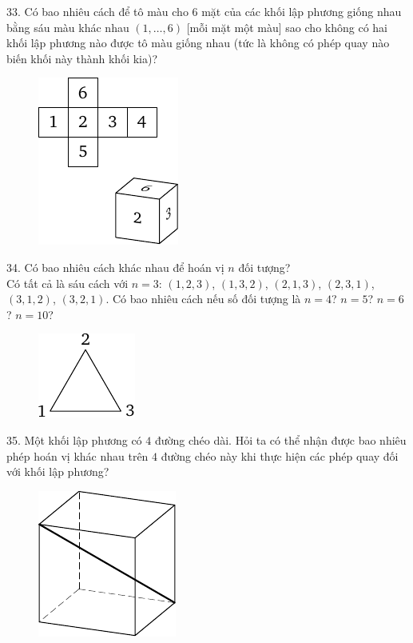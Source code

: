\begin{problem}{33.}
	Có bao nhiêu cách để tô màu cho 6 mặt của các khối lập phương giống nhau bằng sáu màu khác nhau $(1,\dotsc,6)$ [mỗi mặt một màu] sao cho không có hai khối lập phương nào được tô màu giống nhau (tức là không có phép quay nào biến khối này thành khối kia)?
	\begin{figure}
		\includegraphics{taskbook-17}
	\end{figure}
\end{problem}

\begin{problem}{34.}
	Có bao nhiêu cách khác nhau để hoán vị $n$ đối tượng?\\
	Có tất cả là sáu cách với $n=3$: $(1,2,3)$, $(1,3,2)$, $(2,1,3)$, $(2,3,1)$, $(3,1,2)$, $(3,2,1)$. Có bao nhiêu cách nếu số đối tượng là $n=4$? $n=5$? $n=6$? $n=10$?
	\begin{figure}
		\includegraphics{taskbook-18}
	\end{figure}
\end{problem}

\begin{problem}{35.}
	Một khối lập phương có $4$ đường chéo dài. Hỏi ta có thể nhận được bao nhiêu phép hoán vị khác nhau trên $4$ đường chéo này khi thực hiện các phép quay đối với khối lập phương?
	\begin{figure}
		\includegraphics{taskbook-19}
	\end{figure}
\end{problem}

